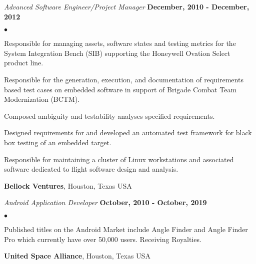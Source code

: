 \documentclass[margin,line]{res}
\newenvironment{list2}{%
  \begin{list}{$\bullet$}{%
      \setlength{\itemsep}{0in}
      \setlength{\parsep}{0in} \setlength{\parskip}{0in}
      \setlength{\topsep}{0in} \setlength{\partopsep}{0in} 
  \setlength{\leftmargin}{0.2in}}}{\end{list}}
\newcommand{\organization}[2] {{\bf #1}, #2\par}
\newcommand{\role}[2]{\vspace{-1em}\emph{#1} \hfill \textbf{#2}}
\begin{document}
\begin{resume}
\role{Advanced Software Engineer/Project Manager}{December, 2010 - December, 2012}
\begin{list2}
\item Responsible for managing assets, software states and testing metrics for the System Integration Bench (SIB) supporting the Honeywell Ovation Select product line.
\item Responsible for the generation, execution, and documentation of requirements based test cases on embedded software in support of Brigade Combat Team Modernization (BCTM).
\item Composed ambiguity and testability analyses specified requirements.
\item Designed requirements for and developed an automated test framework for black box testing of an embedded target.
\item Responsible for maintaining a cluster of Linux workstations and associated software dedicated to flight software design and analysis.
\end{list2}

\organization{Bellock Ventures}{Houston, Texas USA}

\role{Android Application Developer}{October, 2010 - October, 2019}
\begin{list2}
\item Published titles on the Android Market include Angle Finder and Angle Finder Pro which currently have over 50,000 users. Receiving Royalties.
\end{list2}

\organization{United Space Alliance}{Houston, Texas USA}


\end{resume}
\end{document}
